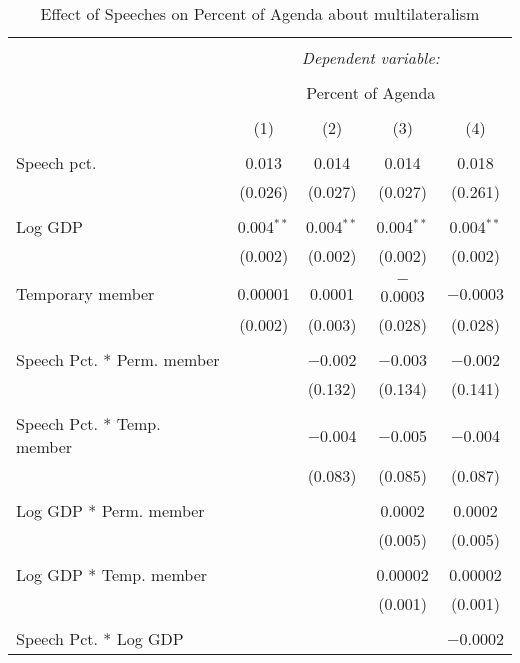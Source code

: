 
\begin{table}[!htbp] \centering 
  \caption{Effect of Speeches on Percent of Agenda about  multilateralism} 
  \label{} 
\begin{tabular}{@{\extracolsep{5pt}}lcccc} 
\\[-1.8ex]\hline 
\hline \\[-1.8ex] 
 & \multicolumn{4}{c}{\textit{Dependent variable:}} \\ 
\cline{2-5} 
\\[-1.8ex] & \multicolumn{4}{c}{Percent of Agenda} \\ 
\\[-1.8ex] & (1) & (2) & (3) & (4)\\ 
\hline \\[-1.8ex] 
 Speech pct. & 0.013 & 0.014 & 0.014 & 0.018 \\ 
  & (0.026) & (0.027) & (0.027) & (0.261) \\ 
  & & & & \\ 
 Log GDP & 0.004$^{**}$ & 0.004$^{**}$ & 0.004$^{**}$ & 0.004$^{**}$ \\ 
  & (0.002) & (0.002) & (0.002) & (0.002) \\ 
  & & & & \\ 
 Temporary member & 0.00001 & 0.0001 & $-$0.0003 & $-$0.0003 \\ 
  & (0.002) & (0.003) & (0.028) & (0.028) \\ 
  & & & & \\ 
 Speech Pct. * Perm. member &  & $-$0.002 & $-$0.003 & $-$0.002 \\ 
  &  & (0.132) & (0.134) & (0.141) \\ 
  & & & & \\ 
 Speech Pct. * Temp. member &  & $-$0.004 & $-$0.005 & $-$0.004 \\ 
  &  & (0.083) & (0.085) & (0.087) \\ 
  & & & & \\ 
 Log GDP * Perm. member &  &  & 0.0002 & 0.0002 \\ 
  &  &  & (0.005) & (0.005) \\ 
  & & & & \\ 
 Log GDP * Temp. member &  &  & 0.00002 & 0.00002 \\ 
  &  &  & (0.001) & (0.001) \\ 
  & & & & \\ 
 Speech Pct. * Log GDP &  &  &  & $-$0.0002 \\ 

\end{tabular}
\end{table}
